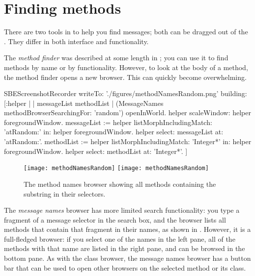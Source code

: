 \documentclass[a4paper,10pt,twoside]{book}
\begin{document}


\section{Finding methods}
\label{sec:methodFinder} 

There are two tools in \sq to help you find messages; both can be dragged out of the \toolsflapind.
They differ in both interface and functionality.

The \emph{method finder} was described at some length in ; you can use it to find methods by name or by functionality. 
However, to look at the body of a method, the method finder opens a new browser.
This can quickly become overwhelming.

\begin{ExecuteSmalltalkScript}
SBEScreenshotRecorder writeTo: './figures/methodNamesRandom.png' building: [:helper |
	| messageList methodList |
	(MessageNames methodBrowserSearchingFor: 'random') openInWorld.
	helper scaleWindow: helper foregroundWindow.
	messageList := helper listMorphIncludingMatch: 'atRandom:' in: helper foregroundWindow.
	helper select: messageList at: 'atRandom:'.
	methodList := helper listMorphIncludingMatch: 'Integer*' in: helper foregroundWindow.
	helper select: methodList at: 'Integer*'.
]
\end{ExecuteSmalltalkScript}
\begin{figure}[btp]
	\begin{center}
	\ifluluelse
		{\texttt{[image: methodNamesRandom]}}
		{\texttt{[image: methodNamesRandom]}}
	\end{center}
	\caption{The method names browser showing all methods containing the substring  in their selectors.}
	\label{fig:methodNamesRandom}
\end{figure}

The \emph{message names} browser has more limited search functionality: you type a fragment of a message selector in the search box, and the browser lists all methods that contain that fragment in their names, as shown in .
However, it is a full-fledged browser:
if you select one of the names in the left pane, all of the methods with that name are listed in the right pane, and can be browsed in the bottom pane.
As with the class browser, the message names browser has a button bar that can be used to open other  browsers on the selected method or its class.
\end{document}

